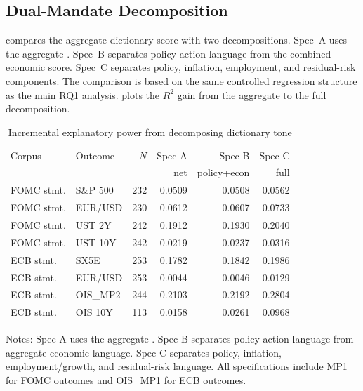 \subsection{Dual-Mandate Decomposition}
\label{sec:res_dual_mandate_new}

 compares the aggregate dictionary score with
two decompositions. Spec~A uses the aggregate \netscore{}. Spec~B separates
policy-action language from the combined economic score. Spec~C separates
policy, inflation, employment, and residual-risk components. The comparison is
based on the same controlled regression structure as the main RQ1 analysis.
 plots the $R^2$ gain from the aggregate
to the full decomposition.


\begin{table}[H]
\centering
\caption{Incremental explanatory power from decomposing dictionary tone}
\label{tab:dual_mandate_r2_v31}
\begin{threeparttable}
\footnotesize
\setlength{\tabcolsep}{5pt}
\renewcommand{\arraystretch}{1.08}
\begin{tabular*}{\textwidth}{@{\extracolsep{\fill}}llrrrr@{}}
\toprule
Corpus & Outcome & $N$ & Spec A & Spec B & Spec C \\
       &         &     & net & policy+econ & full \\
\midrule
FOMC stmt. & S\&P 500 & 232 & 0.0509 & 0.0508 & 0.0562 \\
FOMC stmt. & EUR/USD & 230 & 0.0612 & 0.0607 & 0.0733 \\
FOMC stmt. & UST 2Y & 242 & 0.1912 & 0.1930 & 0.2040 \\
FOMC stmt. & UST 10Y & 242 & 0.0219 & 0.0237 & 0.0316 \\
ECB stmt. & SX5E & 253 & 0.1782 & 0.1842 & 0.1986 \\
ECB stmt. & EUR/USD & 253 & 0.0044 & 0.0046 & 0.0129 \\
ECB stmt. & OIS\_MP2 & 244 & 0.2103 & 0.2192 & 0.2804 \\
ECB stmt. & OIS 10Y & 113 & 0.0158 & 0.0261 & 0.0968 \\
\bottomrule
\end{tabular*}
\begin{tablenotes}[flushleft]
\footnotesize
\item Notes: Spec A uses the aggregate \netscore{}. Spec B separates policy-action language from aggregate economic language. Spec C separates policy, inflation, employment/growth, and residual-risk language. All specifications include MP1 for FOMC outcomes and OIS\_MP1 for ECB outcomes.
\end{tablenotes}
\end{threeparttable}
\end{table}

